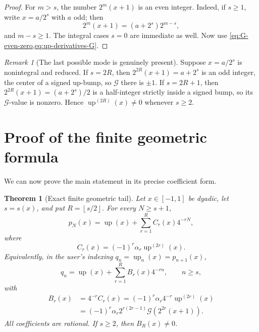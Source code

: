 \documentclass[11pt]{article}
\newtheorem{theorem}{Theorem}[section]
\theoremstyle{definition}
\theoremstyle{remark}
\newtheorem{remark}[remark]{Remark}
\newcommand{\rv}{\operatorname{up}}
\newcommand{\Global}{\mathcal G}
\newcommand{\floor}[1]{\left\lfloor #1\right\rfloor}
\begin{document}
\begin{proof}
For \(m>s\), the number \(2^m(x+1)\) is an even integer.  Indeed, if
\(s\ge1\), write \(x=a/2^s\) with \(a\) odd; then
\[
 2^m(x+1)=(a+2^s)2^{m-s},
\]
and \(m-s\ge1\).  The integral cases \(s=0\) are immediate as well.  Now use
\cref{eq:G-even-zero,eq:up-derivatives-G}.
\end{proof}

\begin{remark}[The last possible mode is genuinely present]
Suppose \(x=a/2^s\) is nonintegral and reduced.  If \(s=2R\), then
\(2^{2R}(x+1)=a+2^s\) is an odd integer, the center of a signed up-bump, so
\(\Global\) there is \(\pm1\).  If \(s=2R+1\), then
\(2^{2R}(x+1)=(a+2^s)/2\) is a half-integer strictly inside a signed bump, so
its \(\Global\)-value is nonzero.  Hence \(\rv^{(2R)}(x)\ne0\) whenever
\(s\ge2\).
\end{remark}

\section{Proof of the finite geometric formula}

We can now prove the main statement in its precise coefficient form.

\begin{theorem}[Exact finite geometric tail]
\label{thm:finite-geometric}
Let \(x\in[-1,1]\) be dyadic, let \(s=s(x)\), and put
\(R=\floor{s/2}\).  For every \(N\ge s+1\),
\begin{equation}
 \boxed{
 p_N(x)=\rv(x)+\sum_{r=1}^{R}C_r(x)4^{-rN},}
 \label{eq:pN-geometric}
\end{equation}
where
\begin{equation}
 C_r(x)=(-1)^r\alpha_r\rv^{(2r)}(x).
 \label{eq:C-r}
\end{equation}
Equivalently, in the user's indexing \(q_n=\rv_n(x)=p_{n+1}(x)\),
\begin{equation}
 \boxed{
 q_n=\rv(x)+\sum_{r=1}^{R}B_r(x)4^{-rn},
 \qquad n\ge s,}
 \label{eq:qn-geometric}
\end{equation}
with
\begin{align}
 B_r(x)
 &=4^{-r}C_r(x)
 =(-1)^r\alpha_r4^{-r}\rv^{(2r)}(x)
 \label{eq:B-r-derivative}\\
 &=(-1)^r\alpha_r2^{r(2r-1)}
 \Global\!\left(2^{2r}(x+1)\right).
 \label{eq:B-r-global}
\end{align}
All coefficients are rational.  If \(s\ge2\), then \(B_R(x)\ne0\).
\end{theorem}
\end{document}
